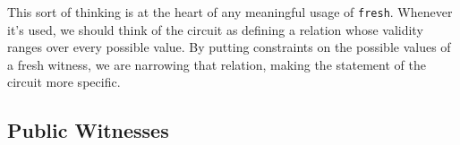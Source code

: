 This sort of thinking is at the heart of any meaningful usage of \lstinline{fresh}. Whenever it's used, we should think of the circuit as defining a relation whose validity ranges over every possible value. By putting constraints on the possible values of a fresh witness, we are narrowing that relation, making the statement of the circuit more specific.

\subsection{Public Witnesses}
